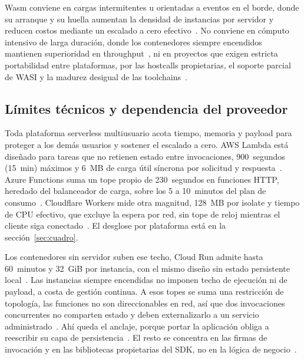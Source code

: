 \documentclass[12pt, letterpaper, table, xcdraw]{inf-pucv}
\begin{document}
Wasm conviene en cargas intermitentes u orientadas a eventos en el borde, donde su arranque y su huella aumentan la densidad de instancias por servidor y reducen costos mediante un escalado a cero efectivo~\cite{kjorveziroski2021iot, shillaker2020faasm}. No conviene en cómputo intensivo de larga duración, donde los contenedores siempre encendidos mantienen superioridad en throughput~\cite{jangda2019notsofast}, ni en proyectos que exigen estricta portabilidad entre plataformas, por las hostcalls propietarias, el soporte parcial de WASI y la madurez desigual de las toolchains~\cite{wasi2026releases, fastlycomputesdks, cloudflare2026wasm}.
\subsection{Límites técnicos y dependencia del proveedor}
\label{sec:limites_dependencias}

Toda plataforma serverless multiusuario acota tiempo, memoria y payload para proteger a los demás usuarios y sostener el escalado a cero. AWS Lambda está diseñado para tareas que no retienen estado entre invocaciones, 900~segundos (15~min) máximos y 6~MB de carga útil síncrona por solicitud y respuesta~\parencite{awslambda2026quotas}. Azure Functions suma un tope propio de 230~segundos en funciones HTTP, heredado del balanceador de carga, sobre los 5 a 10~minutos del plan de consumo~\parencite{microsoft2026functionsscale}. Cloudflare Workers mide otra magnitud, 128~MB por isolate y tiempo de CPU efectivo, que excluye la espera por red, sin tope de reloj mientras el cliente siga conectado~\parencite{cloudflare2026workerslimits}. El desglose por plataforma está en la sección~\ref{sec:cuadro}. 

Los contenedores sin servidor suben ese techo, Cloud Run admite hasta 60~minutos y 32~GiB por instancia, con el mismo diseño sin estado persistente local~\parencite{gcp2026runtimeout, gcp2026runmemory}. Las instancias siempre encendidas no imponen techo de ejecución ni de payload, a costa de gestión continua. A esos topes se suma una restricción de topología, las funciones no son direccionables en red, así que dos invocaciones concurrentes no comparten estado y deben externalizarlo a un servicio administrado~\parencite{predoaia2024cloudagnostic}. Ahí queda el anclaje, porque portar la aplicación obliga a reescribir su capa de persistencia~\parencite{predoaia2024cloudagnostic, wen2023}. El resto se concentra en las firmas de invocación y en las bibliotecas propietarias del SDK, no en la lógica de negocio~\parencite{rodrigues2022quickfaas}.
\end{document}
